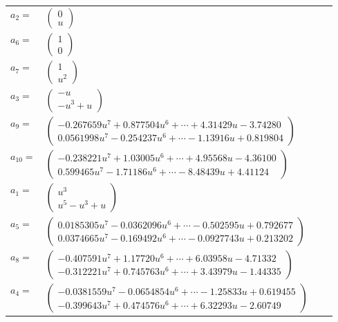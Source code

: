 \documentclass[1p]{elsarticle_modified}
\theoremstyle{definition}
\begin{document}
\begin{tabular}{m{7pt} m{180pt} m{7pt} m{180pt} }
\flushright $a_{2}=$&$\begin{pmatrix}0\\u\end{pmatrix}$ \\
\flushright $a_{6}=$&$\begin{pmatrix}1\\0\end{pmatrix}$ \\
\flushright $a_{7}=$&$\begin{pmatrix}1\\u^2\end{pmatrix}$ \\
\flushright $a_{3}=$&$\begin{pmatrix}- u\\- u^3+u\end{pmatrix}$ \\
\flushright $a_{9}=$&$\begin{pmatrix}-0.267659 u^{7}+0.877504 u^{6}+\cdots+4.31429 u-3.74280\\0.0561998 u^{7}-0.254237 u^{6}+\cdots-1.13916 u+0.819804\end{pmatrix}$ \\
\flushright $a_{10}=$&$\begin{pmatrix}-0.238221 u^{7}+1.03005 u^{6}+\cdots+4.95568 u-4.36100\\0.599465 u^{7}-1.71186 u^{6}+\cdots-8.48439 u+4.41124\end{pmatrix}$ \\
\flushright $a_{1}=$&$\begin{pmatrix}u^3\\u^5- u^3+u\end{pmatrix}$ \\
\flushright $a_{5}=$&$\begin{pmatrix}0.0185305 u^{7}-0.0362096 u^{6}+\cdots-0.502595 u+0.792677\\0.0374665 u^{7}-0.169492 u^{6}+\cdots-0.0927743 u+0.213202\end{pmatrix}$ \\
\flushright $a_{8}=$&$\begin{pmatrix}-0.407591 u^{7}+1.17720 u^{6}+\cdots+6.03958 u-4.71332\\-0.312221 u^{7}+0.745763 u^{6}+\cdots+3.43979 u-1.44335\end{pmatrix}$ \\
\flushright $a_{4}=$&$\begin{pmatrix}-0.0381559 u^{7}-0.0654854 u^{6}+\cdots-1.25833 u+0.619455\\-0.399643 u^{7}+0.474576 u^{6}+\cdots+6.32293 u-2.60749\end{pmatrix}$ \\

\end{tabular}
\end{document}
